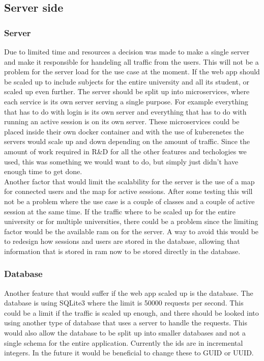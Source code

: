 \subsection{Server side}
\subsubsection{Server}
Due to limited time and resources a decision was made to make a single server and make it responsible for handeling all traffic from the users. This will not be a problem for the server load for the use case at the moment. If the web app should be scaled up to include subjects for the entire university and all its student, or scaled up even further. The server should be split up into microservices, where each service is its own server serving a single purpose. For example everything that has to do with login is its own server and everything that has to do with running an active session is on its own server. These microservices could be placed inside their own docker container and with the use of kuberenetes the servers would scale up and down depending on the amount of traffic. Since the amount of work required in R\&D for all the other features and techologies we used, this was something we would want to do, but simply just didn't have enough time to get done.
\\[11pt]
Another factor that would limit the scalability for the server is the use of a map for connected users and the map for active sessions. After some testing this will not be a problem where the use case is a couple of classes and a couple of active session at the same time. If the traffic where to be scaled up for the entire university or for multiple universities, there could be a problem since the limiting factor would be the available ram on for the server. A way to avoid this would be to redesign how sessions and users are stored in the database, allowing that information that is stored in ram now to be stored directly in the database. 
\subsubsection{Database}
Another feature that would suffer if the web app scaled up is the database. The database is using SQLite3 where the limit is 50000 requests per second\cite{SQLite:faqQ19}. This could be a limit if the traffic is scaled up enough, and there should be looked into using another type of database that uses a server to handle the requests. This would also allow the database to be split up into smaller databases and not a single schema for the entire application. Currently the ids are in incremental integers. In the future it would be beneficial to change these to GUID or UUID.\cite{UUIDE}